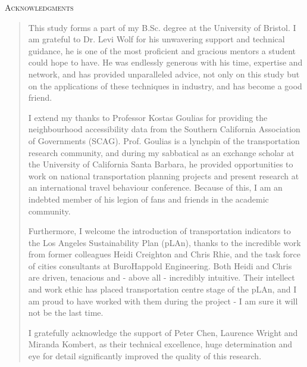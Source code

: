 \documentclass[a4paper,UKenglish]{lipics-v2018}
\begin{document}
\LARGE\textsc{Acknowledgments}
\begin{quote}
\normalsize
This study forms a part of my B.Sc. degree at the University of Bristol. I am grateful to Dr. Levi Wolf for his unwavering support and technical guidance, he is one of the most proficient and gracious mentors a student could hope to have. He was endlessly generous with his time, expertise and network, and has provided unparalleled advice, not only on this study but on the applications of these techniques in industry, and has become a good friend.

I extend my thanks to Professor Kostas Goulias for providing the neighbourhood accessibility data from the Southern California Association of Governments (SCAG). Prof. Goulias is a lynchpin of the transportation research community, and during my sabbatical as an exchange scholar at the University of California Santa Barbara, he provided opportunities to work on national transportation planning projects and present research at an international travel behaviour conference. Because of this, I am an indebted member of his legion of fans and friends in the academic community.

Furthermore, I welcome the introduction of transportation indicators to the Los Angeles Sustainability Plan (pLAn), thanks to the incredible work from former colleagues Heidi Creighton and Chris Rhie, and the task force of cities consultants at BuroHappold Engineering. Both Heidi and Chris are driven, tenacious and - above all - incredibly intuitive. Their intellect and work ethic has placed transportation centre stage of the pLAn, and I am proud to have worked with them during the project - I am sure it will not be the last time.

I gratefully acknowledge the support of Peter Chen, Laurence Wright and Miranda Kombert, as their technical excellence, huge determination and eye for detail significantly improved the quality of this research. 

\end{quote}
\pagebreak

\maketitle
\end{document}
